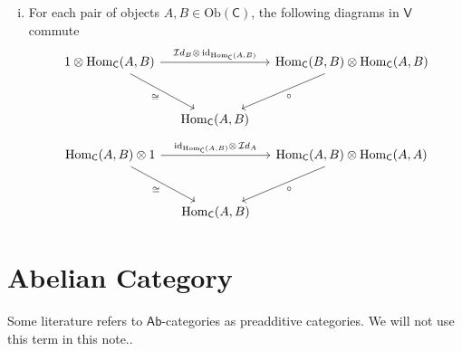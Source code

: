 \documentclass{report}
\begin{document}
{\begin{enumerate}[(i)]
\[\begin{tikzcd}[ampersand replacement=\&, column sep=small]
\end{tikzcd}
    \]
    \item For each pair of objects $A,B\in \mathrm{Ob}(\mathsf{C})$, the following diagrams in $\mathsf{V}$ commute
    \[
    \begin{tikzcd}[ampersand replacement=\&, column sep=small]
        {1\otimes \mathrm{Hom}_{\mathsf{C}}(A,B)} \arrow[rr, "{{\mathcal{I}d}_B\otimes\,\mathrm{id}_{\mathrm{Hom}_{\mathsf{C}}(A,B)}}"] \arrow[rd, "\cong"'] \&                     \& {\mathrm{Hom}_{\mathsf{C}}(B,B)\otimes \mathrm{Hom}_{\mathsf{C}}(A,B)} \arrow[ld, "\circ"] \\[+10pt]
        \& {\mathrm{Hom}_{\mathsf{C}}(A,B)} \&   
\end{tikzcd}
    \]
    \[
        \begin{tikzcd}[ampersand replacement=\&, column sep=small]
            {\mathrm{Hom}_{\mathsf{C}}(A,B)\otimes 1} \arrow[rr, "\mathrm{id}_{\mathrm{Hom}_{\mathsf{C}}(A,B)}\otimes\,{\mathcal{I}d}_A "] \arrow[rd, "\cong"'] \&                     \& {\mathrm{Hom}_{\mathsf{C}}(A,B)\otimes \mathrm{Hom}_{\mathsf{C}}(A,A)} \arrow[ld, "\circ"] \\[+10pt]
            \& {\mathrm{Hom}_{\mathsf{C}}(A,B)} \&
    \end{tikzcd}
        \]
    \end{enumerate}
}


\section{Abelian Category}
Some literature refers to $\mathsf{Ab}$-categories as preadditive categories. We will not use this term in this note..
\end{document}
